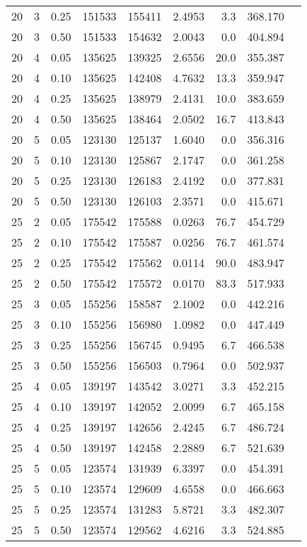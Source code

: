 \begin{table}
\begin{center}
\begin{tabular}{|c|c|c|r|r|c|r|r|r|}
20 & 3 & 0.25 & 151533 & 155411 & 2.4953 & 3.3 & 368.170 \\
20 & 3 & 0.50 & 151533 & 154632 & 2.0043 & 0.0 & 404.894 \\
20 & 4 & 0.05 & 135625 & 139325 & 2.6556 & 20.0 & 355.387 \\
20 & 4 & 0.10 & 135625 & 142408 & 4.7632 & 13.3 & 359.947 \\
20 & 4 & 0.25 & 135625 & 138979 & 2.4131 & 10.0 & 383.659 \\
20 & 4 & 0.50 & 135625 & 138464 & 2.0502 & 16.7 & 413.843 \\
20 & 5 & 0.05 & 123130 & 125137 & 1.6040 & 0.0 & 356.316 \\
20 & 5 & 0.10 & 123130 & 125867 & 2.1747 & 0.0 & 361.258 \\
20 & 5 & 0.25 & 123130 & 126183 & 2.4192 & 0.0 & 377.831 \\
20 & 5 & 0.50 & 123130 & 126103 & 2.3571 & 0.0 & 415.671 \\
25 & 2 & 0.05 & 175542 & 175588 & 0.0263 & 76.7 & 454.729 \\
25 & 2 & 0.10 & 175542 & 175587 & 0.0256 & 76.7 & 461.574 \\
25 & 2 & 0.25 & 175542 & 175562 & 0.0114 & 90.0 & 483.947 \\
25 & 2 & 0.50 & 175542 & 175572 & 0.0170 & 83.3 & 517.933 \\
25 & 3 & 0.05 & 155256 & 158587 & 2.1002 & 0.0 & 442.216 \\
25 & 3 & 0.10 & 155256 & 156980 & 1.0982 & 0.0 & 447.449 \\
25 & 3 & 0.25 & 155256 & 156745 & 0.9495 & 6.7 & 466.538 \\
25 & 3 & 0.50 & 155256 & 156503 & 0.7964 & 0.0 & 502.937 \\
25 & 4 & 0.05 & 139197 & 143542 & 3.0271 & 3.3 & 452.215 \\
25 & 4 & 0.10 & 139197 & 142052 & 2.0099 & 6.7 & 465.158 \\
25 & 4 & 0.25 & 139197 & 142656 & 2.4245 & 6.7 & 486.724 \\
25 & 4 & 0.50 & 139197 & 142458 & 2.2889 & 6.7 & 521.639 \\
25 & 5 & 0.05 & 123574 & 131939 & 6.3397 & 0.0 & 454.391 \\
25 & 5 & 0.10 & 123574 & 129609 & 4.6558 & 0.0 & 466.663 \\
25 & 5 & 0.25 & 123574 & 131283 & 5.8721 & 3.3 & 482.307 \\
25 & 5 & 0.50 & 123574 & 129562 & 4.6216 & 3.3 & 524.885 \\

\end{tabular}
\end{center}
\end{table}
